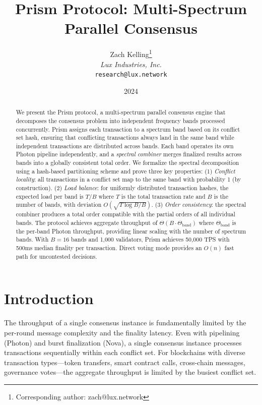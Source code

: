 \documentclass[11pt,a4paper]{article}
\title{\textbf{Prism Protocol: Multi-Spectrum Parallel Consensus}}
\author{
Zach Kelling\thanks{Corresponding author: zach@lux.network}\\
\textit{Lux Industries, Inc.}\\
\texttt{research@lux.network}
}
\date{2024}
\begin{document}
\luxcoverpage

\begin{abstract}
We present the Prism protocol, a multi-spectrum parallel consensus engine that
decomposes the consensus problem into independent frequency bands processed concurrently.
Prism assigns each transaction to a spectrum band based on its conflict set hash,
ensuring that conflicting transactions always land in the same band while independent
transactions are distributed across bands. Each band operates its own Photon pipeline
independently, and a \emph{spectral combiner} merges finalized results across bands
into a globally consistent total order.
We formalize the spectral decomposition using a hash-based partitioning scheme and
prove three key properties:
(1) \emph{Conflict locality}: all transactions in a conflict set map to the same band
with probability 1 (by construction).
(2) \emph{Load balance}: for uniformly distributed transaction hashes, the expected
load per band is $T/B$ where $T$ is the total transaction rate and $B$ is the number
of bands, with deviation $O(\sqrt{T \log B / B})$.
(3) \emph{Order consistency}: the spectral combiner produces a total order compatible
with the partial orders of all individual bands.
The protocol achieves aggregate throughput of $\Theta(B \cdot \Theta_{\text{band}})$
where $\Theta_{\text{band}}$ is the per-band Photon throughput, providing linear
scaling with the number of spectrum bands. With $B = 16$ bands and 1,000 validators,
Prism achieves 50,000 TPS with 500ms median finality per transaction.
Direct voting mode provides an $O(n)$ fast path for uncontested decisions.
\end{abstract}

\tableofcontents
\newpage

\section{Introduction}
\label{sec:introduction}

The throughput of a single consensus instance is fundamentally limited by the per-round
message complexity and the finality latency. Even with pipelining (Photon) and burst
finalization (Nova), a single consensus instance processes transactions sequentially
within each conflict set. For blockchains with diverse transaction types---token
transfers, smart contract calls, cross-chain messages, governance votes---the aggregate
throughput is limited by the busiest conflict set.
\end{document}

